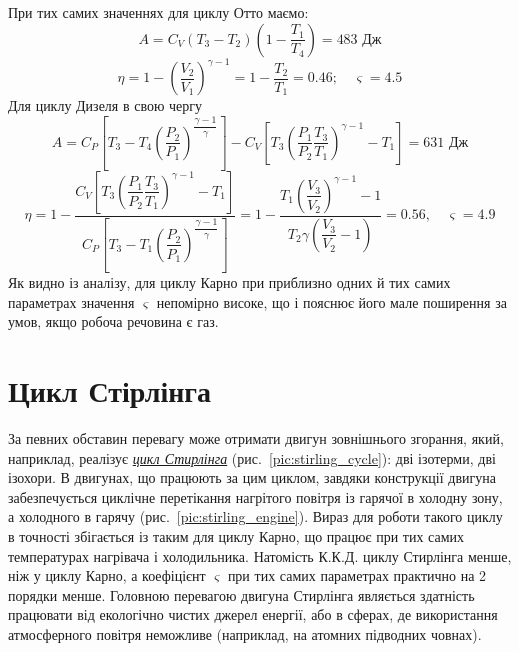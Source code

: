  При тих самих значеннях для циклу Отто маємо:
\begin{equation}\label{2.65}
	A = C_V (T_3-T_2)\left(1-\frac{T_1}{T_4}\right) = 483 \text{ Дж}
\end{equation}
\begin{equation}\label{2.66}
	\eta = 1- \left(\dfrac{V_2}{V_1}\right)^{\gamma-1} = 1 - \dfrac{T_2}{T_1} = 0.46; \quad \varsigma =
4.5
\end{equation}
Для циклу Дизеля в свою чергу
\begin{equation}\label{2.67}
	A = C_P
\left[T_3-T_4\left(\dfrac{P_2}{P_1}\right)^{\dfrac{\gamma-1}{\gamma}}\right]-C_V\left[T_3\left(\dfrac{P_1}{P_2}\dfrac{T_3}{T_1}\right)^{\gamma-1}-T_1\right]
 = 631 \text{ Дж}
\end{equation}
\begin{equation}\label{2.68}
	\eta = 1 - \dfrac{C_V\left[T_3
\left(\dfrac{P_1}{P_2}\dfrac{T_3}{T_1}\right)^{\gamma-1}-T_1\right]}{C_P\left[T_3-T_1\left(\dfrac{P_2}{P_1}\right)^{\dfrac{\gamma-1}{\gamma}}\right]}
 = 1 -\dfrac{T_1\left(\dfrac{V_3}{V_2}\right)^{\gamma-1}-1}{T_2\gamma\left(\dfrac{V_3}{V_2}-1\right)}
= 0.56, \quad \varsigma = 4.9
\end{equation}
Як видно із аналізу, для циклу Карно при приблизно одних й тих самих параметрах значення $\varsigma$
непомірно високе, що і пояснює його мале поширення за умов, якщо робоча речовина є газ.

\section{Цикл Стірлінга}

За певних обставин перевагу може отримати двигун зовнішнього згорання, який, наприклад, реалізує
\href{https://www.wikiwand.com/en/Thermodynamic_cycle}{\emph{цикл Стирлінга}}
(рис.~\ref{pic:stirling_cycle}): дві ізотерми, дві ізохори. В двигунах, що працюють за
цим циклом, завдяки конструкції двигуна забезпечується циклічне перетікання нагрітого повітря із
гарячої в холодну зону, а холодного в гарячу (рис.~\ref{pic:stirling_engine}). Вираз для роботи такого
циклу в точності збігається із
таким для циклу Карно, що працює при тих самих температурах нагрівача і холодильника. Натомість
К.К.Д.
циклу Стирлінга менше, ніж у циклу Карно, а коефіцієнт $\varsigma$ при тих самих параметрах практично
на 2 порядки менше. Головною перевагою двигуна Стирлінга являється здатність працювати від екологічно
чистих джерел енергії, або в сферах, де використання атмосферного повітря неможливе (наприклад, на
атомних підводних човнах).

